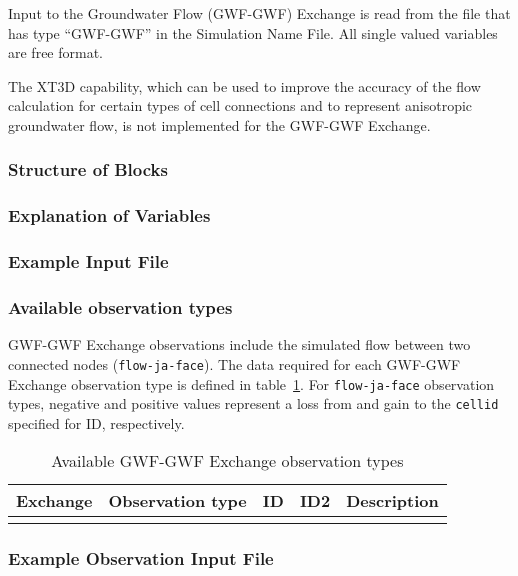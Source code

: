 Input to the Groundwater Flow (GWF-GWF) Exchange is read from the file that has type ``GWF-GWF'' in the Simulation Name File.  All single valued variables are free format.

The XT3D capability, which can be used to improve the accuracy of the flow calculation for certain types of cell connections and to represent anisotropic groundwater flow, is not implemented for the GWF-GWF Exchange.

\vspace{5mm}
\subsubsection{Structure of Blocks}




\vspace{5mm}
\subsubsection{Explanation of Variables}
\begin{description}

\end{description}

\vspace{5mm}
\subsubsection{Example Input File}


\vspace{5mm}
\subsubsection{Available observation types}
GWF-GWF Exchange observations include the simulated flow between two connected nodes (\texttt{flow-ja-face}). The data required for each GWF-GWF Exchange observation type is defined in table~\ref{table:gwf-gwfobstype}. For \texttt{flow-ja-face} observation types, negative and positive values represent a loss from and gain to the \texttt{cellid} specified for ID, respectively.

\begin{longtable}{p{2cm} p{2.75cm} p{2cm} p{1.25cm} p{7cm}}
\caption{Available GWF-GWF Exchange observation types} \tabularnewline

\hline
\hline
\textbf{Exchange} & \textbf{Observation type} & \textbf{ID} & \textbf{ID2} & \textbf{Description} \\
\hline
\endhead

\hline
\endfoot


\label{table:gwf-gwfobstype}
\end{longtable}


\vspace{5mm}
\subsubsection{Example Observation Input File}


